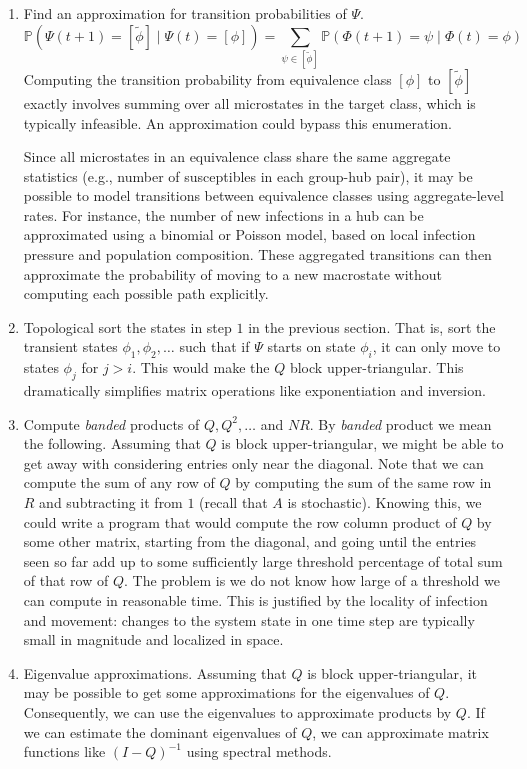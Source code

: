\documentclass[a4paper]{article}
\begin{document}
	\begin{enumerate}
		\item Find an approximation for transition probabilities of $\Psi$.
		$$\mathbb{P}(\Psi(t + 1) = [\tilde{\phi}] \mid \Psi(t) = [\phi]) = \sum_{\psi \in [\tilde{\phi}]}\mathbb{P}(\Phi(t + 1) = \psi \mid \Phi(t) = \phi)$$
		Computing the transition probability from equivalence class $[\phi]$ to $[\tilde{\phi}]$ exactly involves summing over all microstates in the target class, which is typically infeasible. An approximation could bypass this enumeration.
		
		Since all microstates in an equivalence class share the same aggregate statistics (e.g., number of susceptibles in each group-hub pair), it may be possible to model transitions between equivalence classes using aggregate-level rates. For instance, the number of new infections in a hub can be approximated using a binomial or Poisson model, based on local infection pressure and population composition. These aggregated transitions can then approximate the probability of moving to a new macrostate without computing each possible path explicitly.
		\item Topological sort the states in step $1$ in the previous section. That is, sort the transient states $\phi_{1}, \phi_{2}, \dots$ such that if $\Psi$ starts on state $\phi_{i}$, it can only move to states $\phi_{j}$ for $j > i$. This would make the $Q$ block upper-triangular. This dramatically simplifies matrix operations like exponentiation and inversion.
		\item Compute \textit{banded} products of $Q, Q^{2}, \dots$ and $NR$. By \textit{banded} product we mean the following. Assuming that $Q$ is block upper-triangular, we might be able to get away with considering entries only near the diagonal. Note that we can compute the sum of any row of $Q$ by computing the sum of the same row in $R$ and subtracting it from $1$ (recall that $A$ is stochastic). Knowing this, we could write a program that would compute the row column product of $Q$ by some other matrix, starting from the diagonal, and going until the entries seen so far add up to some sufficiently large threshold percentage of total sum of that row of $Q$. The problem is we do not know how large of a threshold we can compute in reasonable time. This is justified by the locality of infection and movement: changes to the system state in one time step are typically small in magnitude and localized in space.
		\item Eigenvalue approximations. Assuming that $Q$ is block upper-triangular, it may be possible to get some approximations for the eigenvalues of $Q$. Consequently, we can use the eigenvalues to approximate products by $Q$. If we can estimate the dominant eigenvalues of $Q$, we can approximate matrix functions like $(I-Q)^{-1}$ using spectral methods.
		

\end{enumerate}
\end{document}
